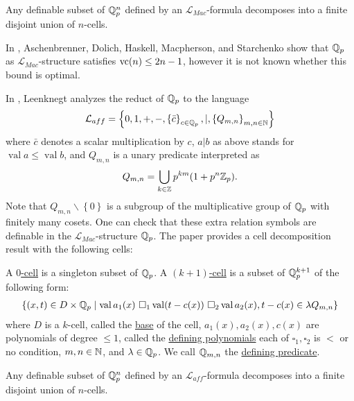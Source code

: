 \documentclass{amsart}
\renewcommand{\LL}{\mathcal L}
\newcommand{\LLM}{\mathcal L_{Mac}}
\newcommand{\curly}[1]{\left\{#1\right\}}
\DeclareMathOperator{\vval}{val}
\newcommand{\defn}{\underline}
\begin{document}
\begin{Theorem} [Denef '84]
  Any definable subset of $\mathbb{Q}_p^n$ defined by an $\LLM$-formula decomposes into a finite disjoint union of $n$-cells.
\end{Theorem}  

In \cite{density}, Aschenbrenner, Dolich, Haskell, Macpherson, and Starchenko show that $\mathbb{Q}_p$ as $\LLM$-structure satisfies $\operatorname{vc}(n) \leq 2n - 1$,
however it is not known whether this bound is optimal.

In \cite{reduct}, Leenknegt analyzes the reduct of $\mathbb{Q}_p$ to the language
\begin{align*}
  \LL_{aff}  = \curly{0, 1, +, -, \curly{\bar c}_{c \in \Q_p}, |, \curly{Q_{m,n}}_{m,n\in \N}}
\end{align*}
where $\bar c$ denotes a scalar multiplication by $c$,
$a | b$ as above stands for $\vval a \leq \vval b$,
and $Q_{m,n}$ is a unary predicate interpreted as
\begin{align*}
  Q_{m,n} = \bigcup_{k \in \mathbb{Z}} p^{km} (1 + p^n\mathbb{Z}_p).
\end{align*}
Note that $Q_{m,n} \backslash \curly{0}$ is a subgroup of the multiplicative group of $\mathbb{Q}_p$ with finitely many cosets.
One can check that these extra relation symbols are definable in the $\LLM$-structure $\mathbb{Q}_p$.
The paper \cite{reduct} provides a cell decomposition result with the following cells:

\begin{Definition} \label{cell}
  A \defn{$0$-cell} is a singleton subset of $\mathbb{Q}_p$.
  A \defn{$(k+1)$-cell} is a subset of $\mathbb{Q}_p^{k+1}$ of the following form:
  \begin{align*}
    \curly{(x, t) \in D \times \Q_p \mid \vval a_1(x) \ \square_1 \vval (t - c(x)) \ \square_2 \vval a_2(x), t - c(x) \in \lambda Q_{m,n} }
  \end{align*}
  where $D$ is a $k$-cell, called the \defn{base} of the cell,
  $a_1(x), a_2(x), c(x)$ are polynomials of degree $\leq 1$, called the \defn{defining polynomials}
  each of $\square_1, \square_2$ is $<$ or no condition,
  $m,n \in \mathbb{N}$,
  and
  $\lambda  \in\mathbb{Q}_p$.
  We call $\mathbb{Q}_{m,n}$ the \defn{defining predicate}.
\end{Definition}

\begin{Theorem}[Leenknegt '12] 
  Any definable subset of $\mathbb{Q}_p^n$ defined by an $\LL_{aff}$-formula decomposes into a finite disjoint union of $n$-cells.
\end{Theorem}  
\end{document}
